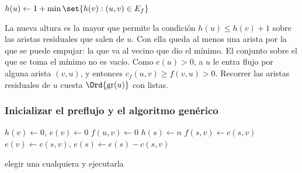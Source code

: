 \documentclass[11pt,letterpaper]{article}
\begin{document}
\begin{algorithm}[H]
\caption{\textsc{Reetiquetar}$(u)$ \ (\textsc{Relabel} en Cormen)}
\label{alg:reetiquetar}
\begin{algorithmic}[1]
  \State $h(u) \gets 1 + \min\set{h(v) : (u, v) \in E_f}$
\EndProcedure
\end{algorithmic}
\end{algorithm}

La nueva altura es la mayor que permite la condición
$h(u) \le h(v) + 1$ sobre las aristas residuales que salen de $u$. Con
ella queda al menos una arista por la que se puede empujar: la que va
al vecino que dio el mínimo. El conjunto sobre el que se toma el
mínimo no es vacío. Como $e(u) > 0$, a $u$ le entra flujo por alguna
arista $(v, u)$, y entonces $c_f(u, v) \ge f(v, u) > 0$. Recorrer las
aristas residuales de $u$ cuesta $\Ord{\text{gr}(u)}$ con listas.

\subsubsection*{Inicializar el preflujo y el algoritmo genérico}

\begin{algorithm}[H]
\caption{\textsc{Inicializar-Preflujo}$(G, s)$}
\label{alg:inicializar-preflujo}
\begin{algorithmic}[1]
    \State $h(v) \gets 0$, \quad $e(v) \gets 0$
  \EndFor
    \State $f(u, v) \gets 0$
  \EndFor
  \State $h(s) \gets n$
    \State $f(s, v) \gets c(s, v)$ 
    \State $e(v) \gets c(s, v)$, \quad $e(s) \gets e(s) - c(s, v)$
  \EndFor
\EndProcedure
\end{algorithmic}
\end{algorithm}

\begin{algorithm}[H]
\caption{\textsc{Empujar-Reetiquetar-Genérico}$(G)$
         \ (\textsc{Generic-Push-Relabel} en Cormen)}
\label{alg:empujar-reetiquetar-generico}
\begin{algorithmic}[1]
  \State {}
    \State elegir una cualquiera y ejecutarla
  \EndWhile
\EndProcedure
\end{algorithmic}
\end{algorithm}
\end{document}
